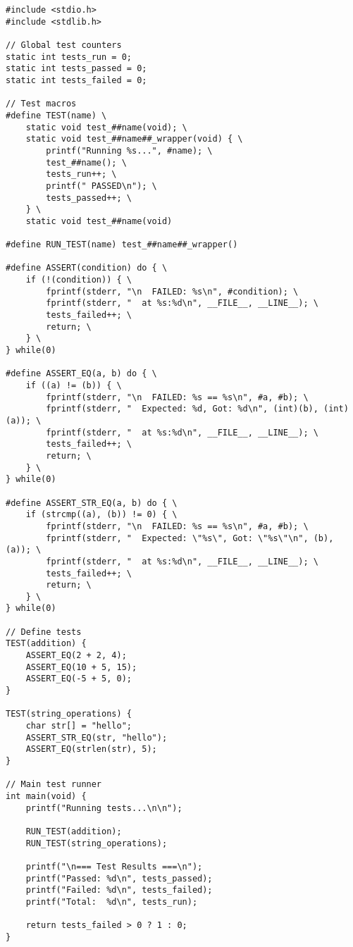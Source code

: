 \begin{lstlisting}
#include <stdio.h>
#include <stdlib.h>

// Global test counters
static int tests_run = 0;
static int tests_passed = 0;
static int tests_failed = 0;

// Test macros
#define TEST(name) \
    static void test_##name(void); \
    static void test_##name##_wrapper(void) { \
        printf("Running %s...", #name); \
        test_##name(); \
        tests_run++; \
        printf(" PASSED\n"); \
        tests_passed++; \
    } \
    static void test_##name(void)

#define RUN_TEST(name) test_##name##_wrapper()

#define ASSERT(condition) do { \
    if (!(condition)) { \
        fprintf(stderr, "\n  FAILED: %s\n", #condition); \
        fprintf(stderr, "  at %s:%d\n", __FILE__, __LINE__); \
        tests_failed++; \
        return; \
    } \
} while(0)

#define ASSERT_EQ(a, b) do { \
    if ((a) != (b)) { \
        fprintf(stderr, "\n  FAILED: %s == %s\n", #a, #b); \
        fprintf(stderr, "  Expected: %d, Got: %d\n", (int)(b), (int)(a)); \
        fprintf(stderr, "  at %s:%d\n", __FILE__, __LINE__); \
        tests_failed++; \
        return; \
    } \
} while(0)

#define ASSERT_STR_EQ(a, b) do { \
    if (strcmp((a), (b)) != 0) { \
        fprintf(stderr, "\n  FAILED: %s == %s\n", #a, #b); \
        fprintf(stderr, "  Expected: \"%s\", Got: \"%s\"\n", (b), (a)); \
        fprintf(stderr, "  at %s:%d\n", __FILE__, __LINE__); \
        tests_failed++; \
        return; \
    } \
} while(0)

// Define tests
TEST(addition) {
    ASSERT_EQ(2 + 2, 4);
    ASSERT_EQ(10 + 5, 15);
    ASSERT_EQ(-5 + 5, 0);
}

TEST(string_operations) {
    char str[] = "hello";
    ASSERT_STR_EQ(str, "hello");
    ASSERT_EQ(strlen(str), 5);
}

// Main test runner
int main(void) {
    printf("Running tests...\n\n");

    RUN_TEST(addition);
    RUN_TEST(string_operations);

    printf("\n=== Test Results ===\n");
    printf("Passed: %d\n", tests_passed);
    printf("Failed: %d\n", tests_failed);
    printf("Total:  %d\n", tests_run);

    return tests_failed > 0 ? 1 : 0;
}
\end{lstlisting}

